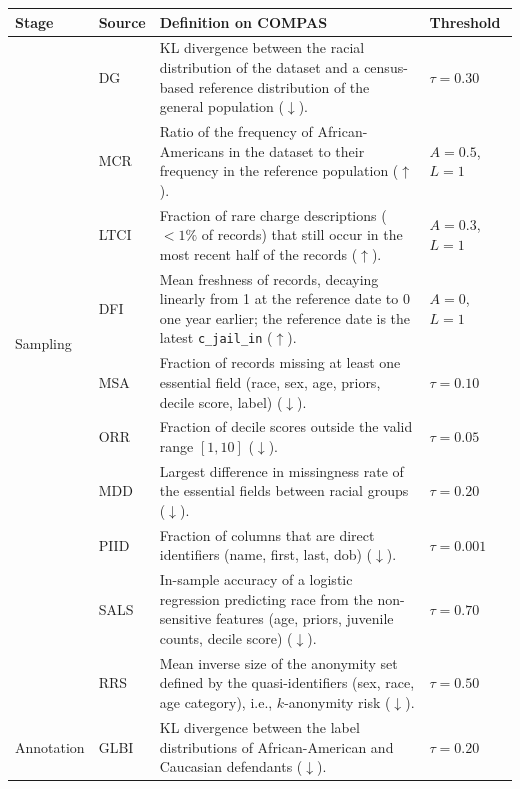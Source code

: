 \begin{table}[!htbp]
  \centering
  \small
  \renewcommand{\arraystretch}{1.15}
  \begin{tabular}{@{}llp{7.9cm}l@{}}
    \toprule
    \textbf{Stage} & \textbf{Source} & \textbf{Definition on COMPAS} & \textbf{Threshold} \\
    \midrule
    \multirow{9}{*}{Sampling}
      & DG   & \ac{KL} divergence between the racial distribution of the dataset and a census-based reference distribution of the general population ($\downarrow$). & $\tau=0.30$ \\
      & MCR  & Ratio of the frequency of African-Americans in the dataset to their frequency in the reference population ($\uparrow$). & $A=0.5$, $L=1$ \\
      & LTCI & Fraction of rare charge descriptions ($<1\%$ of records) that still occur in the most recent half of the records ($\uparrow$). & $A=0.3$, $L=1$ \\
      & DFI  & Mean freshness of records, decaying linearly from 1 at the reference date to 0 one year earlier; the reference date is the latest \texttt{c\_jail\_in} ($\uparrow$). & $A=0$, $L=1$ \\
      & MSA  & Fraction of records missing at least one essential field (race, sex, age, priors, decile score, label) ($\downarrow$). & $\tau=0.10$ \\
    \midrule
    \multirow{9}{*}{Collection}
      & ORR  & Fraction of decile scores outside the valid range $[1,10]$ ($\downarrow$). & $\tau=0.05$ \\
      & MDD  & Largest difference in missingness rate of the essential fields between racial groups ($\downarrow$). & $\tau=0.20$ \\
      & PIID & Fraction of columns that are direct identifiers (name, first, last, dob) ($\downarrow$). & $\tau=0.001$ \\
      & SALS & In-sample accuracy of a logistic regression predicting race from the non-sensitive features (age, priors, juvenile counts, decile score) ($\downarrow$). & $\tau=0.70$ \\
      & RRS  & Mean inverse size of the anonymity set defined by the quasi-identifiers (sex, race, age category), i.e., $k$-anonymity risk ($\downarrow$). & $\tau=0.50$ \\
    \midrule
    Annotation
      & GLBI & \ac{KL} divergence between the label distributions of African-American and Caucasian defendants ($\downarrow$). & $\tau=0.20$ \\

\end{tabular}
\end{table}
